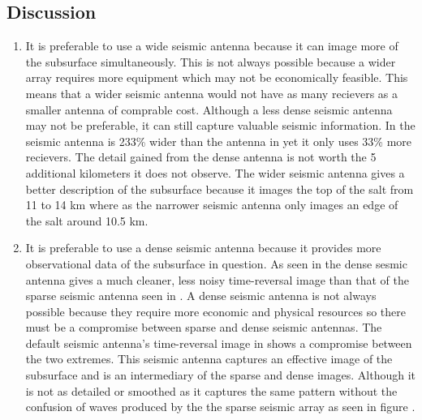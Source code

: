\pagebreak
\subsection{Discussion}
\begin{enumerate}

\item It is preferable to use a wide seismic antenna because it can image more of the subsurface simultaneously. This is not always possible because a wider array requires more equipment which may not be economically feasible. This means that a wider seismic antenna would not have as many recievers as a smaller antenna of comprable cost. Although a less dense seismic antenna may not be preferable, it can still capture valuable seismic information. In  the seismic antenna is 233\% wider than the antenna in  yet it only uses 33\% more recievers. The detail gained from the dense antenna is not worth the 5 additional kilometers it does not observe. The wider seismic antenna gives a better description of the subsurface because it images the top of the salt from 11 to 14 km where as the narrower seismic antenna only images an edge of the salt around 10.5 km.

\item It is preferable to use a dense seismic antenna because it provides more observational data of the subsurface in question. As seen in  the dense sesmic antenna gives a much cleaner, less noisy time-reversal image than that of the sparse seismic antenna seen in . A dense seismic antenna is not always possible because they require more economic and physical resources so there must be a compromise between sparse and dense seismic antennas. The default seismic antenna's time-reversal image in  shows a compromise between the two extremes. This seismic antenna captures an effective image of the subsurface and is an intermediary of the sparse and dense images. Although it is not as detailed or smoothed as  it captures the same pattern without the confusion of waves produced by the the sparse seismic array as seen in figure .


\end{enumerate}
